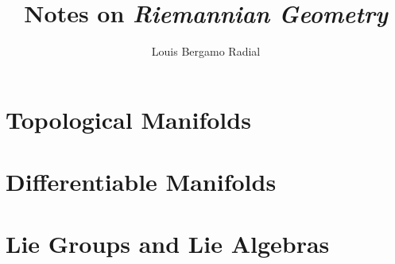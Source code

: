 \documentclass[12pt,oneside,a4paper]{book}
\title{Notes on \textit{Riemannian Geometry}}
\author{Louis Bergamo Radial}
\numberwithin{equation}{section}
\begin{document}
\maketitle

\tableofcontents

\chapter{Topological Manifolds}


\chapter{Differentiable Manifolds}


\chapter{Lie Groups and Lie Algebras}





\printbibliography
\end{document}
